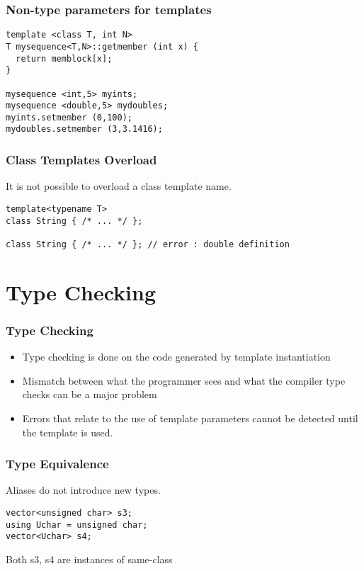 \documentclass{beamer}
\begin{document}
\begin{frame}[fragile]
\frametitle{Non-type parameters for templates}
\begin{lstlisting}
template <class T, int N>
T mysequence<T,N>::getmember (int x) {
  return memblock[x];
}

mysequence <int,5> myints;
mysequence <double,5> mydoubles;
myints.setmember (0,100);
mydoubles.setmember (3,3.1416);

\end{lstlisting}
\end{frame}

\begin{frame}[fragile]
\frametitle{Class Templates Overload}
It is not possible to overload a class template name.
\begin{lstlisting}
template<typename T>
class String { /* ... */ };

class String { /* ... */ }; // error : double definition

\end{lstlisting}
\end{frame}


\section{Type Checking}
\begin{frame}
\frametitle{Type Checking}

\begin{itemize}
\item Type checking is done on the code generated by template instantiation
\item Mismatch between what the programmer sees and what the compiler type checks can be a major problem
\item Errors that relate to the use of template parameters cannot be detected until the template is used.
\end{itemize}

\end{frame}

\begin{frame}[fragile]
\frametitle{Type Equivalence}

Aliases do not introduce new types.

\begin{lstlisting}
vector<unsigned char> s3;
using Uchar = unsigned char;
vector<Uchar> s4;
\end{lstlisting}

Both s3, s4 are instances of same-class

\end{frame}
\end{document}
